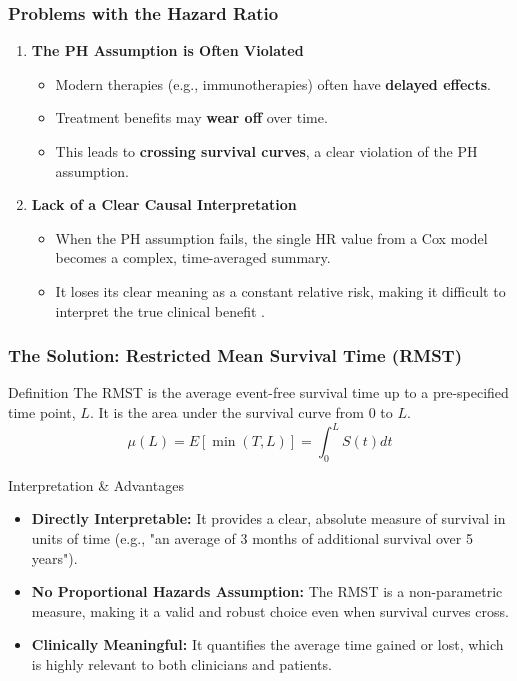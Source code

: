 \documentclass{beamer}
\begin{document}
\begin{frame}
\frametitle{Problems with the Hazard Ratio}
\begin{enumerate}
    \item \textbf{The PH Assumption is Often Violated}
    \begin{itemize}
        \item Modern therapies (e.g., immunotherapies) often have \textbf{delayed effects}.
        \item Treatment benefits may \textbf{wear off} over time.
        \item This leads to \textbf{crossing survival curves}, a clear violation of the PH assumption.
    \end{itemize}
    \vspace{1em}
    \item \textbf{Lack of a Clear Causal Interpretation}
    \begin{itemize}
        \item When the PH assumption fails, the single HR value from a Cox model becomes a complex, time-averaged summary.
        \item It loses its clear meaning as a constant relative risk, making it difficult to interpret the true clinical benefit \cite{uno2014}.
    \end{itemize}
\end{enumerate}
\end{frame}

\begin{frame}
\frametitle{The Solution: Restricted Mean Survival Time (RMST)}
\begin{block}{Definition}
The RMST is the average event-free survival time up to a pre-specified time point, $L$. It is the area under the survival curve from 0 to $L$.
$$\mu(L) = E[\min(T, L)] = \int_0^L S(t) dt$$
\end{block}

\begin{block}{Interpretation \& Advantages}
\begin{itemize}
    \item \textbf{Directly Interpretable:} It provides a clear, absolute measure of survival in units of time (e.g., "an average of 3 months of additional survival over 5 years").
    \item \textbf{No Proportional Hazards Assumption:} The RMST is a non-parametric measure, making it a valid and robust choice even when survival curves cross.
    \item \textbf{Clinically Meaningful:} It quantifies the average time gained or lost, which is highly relevant to both clinicians and patients.
\end{itemize}
\end{block}
\end{frame}
\end{document}
